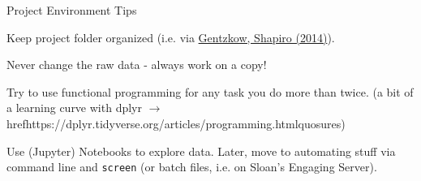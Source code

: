 \documentclass[12pt,aspectratio=169]{beamer}
\newenvironment{wideitemize}{\itemize\addtolength{\itemsep}{10pt}}{\enditemize}
\begin{document}
\begin{frame}{Project Environment Tips}
\begin{wideitemize}
\item<1-> Keep project folder organized (i.e. via \href{https://web.stanford.edu/~gentzkow/research/CodeAndData.pdf}{Gentzkow, Shapiro (2014)}).
\item<2-> Never change the raw data - always work on a copy!
\item<3-> Try to use functional programming for any task you do more than twice. (a bit of a learning curve with dplyr $\rightarrow$href{https://dplyr.tidyverse.org/articles/programming.html}{quosures})
\item<4-> Use (Jupyter) Notebooks to explore data. Later, move to automating stuff via command line and \texttt{screen} (or batch files, i.e. on Sloan's Engaging Server).
\end{wideitemize}
\end{frame}
\end{document}
